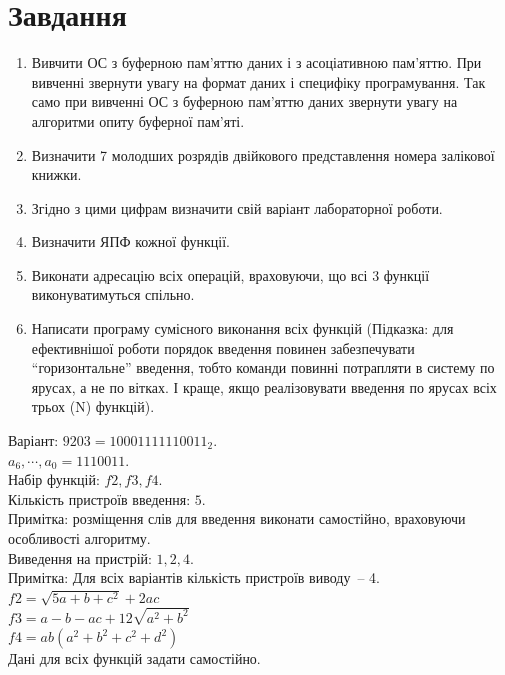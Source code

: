 \documentclass[a4paper, 10pt]{article}
\begin{document}
\section{Завдання}
\begin{enumerate}
    \item Вивчити ОС з буферною пам'яттю даних і з асоціативною пам'яттю. При вивченні звернути увагу на формат даних і специфіку програмування. Так само при вивченні ОС з буферною пам'яттю даних звернути увагу на алгоритми опиту буферної пам'яті.
    \item Визначити 7 молодших розрядів двійкового представлення номера залікової книжки.
    \item Згідно з цими цифрам визначити свій варіант лабораторної роботи.
    \item Визначити ЯПФ кожної функції.
    \item Виконати адресацію всіх операцій, враховуючи, що всі 3 функції виконуватимуться спільно.
    \item Написати програму сумісного виконання всіх функцій (Підказка: для ефективнішої роботи порядок введення повинен забезпечувати ``горизонтальне'' введення, тобто команди повинні потрапляти в систему по ярусах, а не по вітках. І краще, якщо реалізовувати введення по ярусах всіх трьох (N) функцій).
\end{enumerate}

\noindent
Варіант: $9203=10001111110011_2.$\\
$a_{6},\cdots,a_{0}=1110011.$\\
Набір функцій: $f2, f3, f4.$\\
Кількість пристроїв введення: $5.$\\
Примітка: розміщення слів для введення виконати самостійно, враховуючи особливості алгоритму.\\
Виведення на пристрій: $1, 2, 4.$\\
Примітка: Для всіх варіантів кількість пристроїв виводу~-- 4.\\

\noindent
$f2 = \sqrt{5a + b + c^2} + 2ac$\\
$f3 = a - b - ac + 12\sqrt{a^2 + b^2}$\\
$f4 = ab(a^2 + b^2 + c^2 + d^2)$\\

Дані для всіх функцій задати самостійно.
\end{document}
